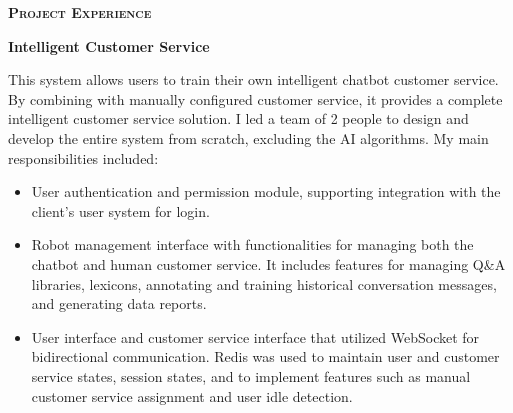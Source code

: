 \documentclass[a4paper]{article}
\newenvironment{changemargin}[2]{%
  \begin{list}{}{%
    \setlength{\topsep}{0pt}%
    \setlength{\leftmargin}{#1}%
    \setlength{\rightmargin}{#2}%
    \setlength{\listparindent}{\parindent}%
    \setlength{\itemindent}{\parindent}%
    \setlength{\parsep}{\parskip}%
  }%
  \item[]}{\end{list}
}
\newcommand{\lineover}{
	\begin{changemargin}{-0.05in}{-0.05in}
		\vspace*{-8pt}
		\hrulefill \\
		\vspace*{-2pt}
	\end{changemargin}
}
\newcommand{\header}[1]{
	\begin{changemargin}{-0.5in}{-0.5in}
		\scshape{\large \textbf{#1}}\\
	\end{changemargin}
}
\newenvironment{body} {
	\vspace*{-16pt}
	\begin{changemargin}{-0.5in}{-0.5in}
  }
	{\end{changemargin}
}
\begin{document}
\header{Project Experience}
\begin{body}

	\vspace{16pt}
	
	\textbf{Intelligent Customer Service}\\

	\begin{justify} 
		This system allows users to train their own intelligent chatbot customer service. By combining with manually configured customer service, it provides a complete intelligent customer service solution. I led a team of 2 people to design and develop the entire system from scratch, excluding the AI algorithms. My main responsibilities included:
	\end{justify}

	\smallskip

	\vspace*{-8pt}
	\begin{itemize} \itemsep -0pt  %
		\item \begin{justify} 
			User authentication and permission module, supporting integration with the client's user system for login.
		\end{justify} 
	\end{itemize}

	\vspace*{-8pt}
	\begin{itemize} \itemsep -0pt  %
		\item \begin{justify}
			Robot management interface with functionalities for managing both the chatbot and human customer service. It includes features for managing Q\&A libraries, lexicons, annotating and training historical conversation messages, and generating data reports.
		\end{justify} 
	\end{itemize}

	\vspace*{-8pt}
	\begin{itemize} \itemsep -0pt  %
		\item \begin{justify} 
			User interface and customer service interface that utilized WebSocket for bidirectional communication. Redis was used to maintain user and customer service states, session states, and to implement features such as manual customer service assignment and user idle detection.
		\end{justify}
	\end{itemize}


\end{body}
\end{document}
